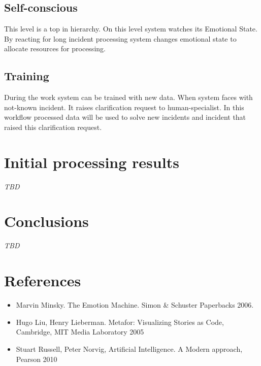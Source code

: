 \documentclass[12pt]{article}
\begin{document}
\subsection{Self-conscious}
This level is a top in hierarchy. On this level system watches its Emotional State. By reacting for long incident processing system changes emotional state to allocate resources for processing.

\subsection{Training}
During the work system can be trained with new data. When system faces with not-known incident. It raises clarification request to human-specialist. In this workflow processed data will be used to solve new incidents and incident that raised this clarification request. 

\section{Initial processing results}

\emph{TBD}

\section{Conclusions}

\emph{TBD}

\section{References}

\begin{itemize}
 \item Marvin Minsky. The Emotion Machine. Simon \& Schuster Paperbacks 2006.
 \item Hugo Liu, Henry Lieberman. Metafor: Visualizing Stories as Code, Cambridge, MIT Media Laboratory 2005
 \item Stuart Russell, Peter Norvig, Artificial Intelligence. A Modern approach, Pearson 2010
\end{itemize}
\end{document}
